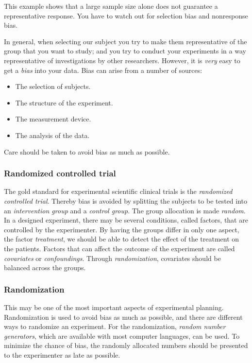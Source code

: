 This example shows that a large sample size alone does not guarantee a representative response. You have to watch out for selection bias and nonresponse bias.

In general, when selecting our subject you try to make them representative of the group that you want to study; and you try to conduct your experiments in a way representative of investigations by other researchers. However, it is \emph{very} easy to get a \emph{bias} into your data. Bias can arise from a number of sources:
\begin{itemize}
  \item The selection of subjects.
  \item The structure of the experiment.
  \item The measurement device.
  \item The analysis of the data.
\end{itemize}
Care should be taken to avoid bias as much as possible.

\subsubsection{Randomized controlled trial} 
The gold standard for experimental scientific clinical trials is the \emph{randomized controlled trial}. Thereby bias is avoided by splitting the subjects to be tested into an \emph{intervention group} and a \emph{control group}. The group allocation is made \emph{random}.
In a designed experiment, there may be several conditions, called factors, that are controlled by the experimenter. By having the groups differ in only one aspect, the factor \emph{treatment}, we should be able to detect the effect of the treatment on the patients.
Factors that can affect the outcome of the experiment are called \emph{covariates} or \emph{confoundings}. Through \emph{randomization}, covariates should be balanced across the groups.

\subsubsection{Randomization} 
This may be one of the most important aspects of experimental planning. Randomization is used to avoid bias as much as possible, and there are different ways to randomize an experiment. For the randomization, \emph{random number generators}, which are available with most computer languages, can be used. To minimize the chance of bias, the randomly allocated numbers should be presented to the experimenter as late as possible.


